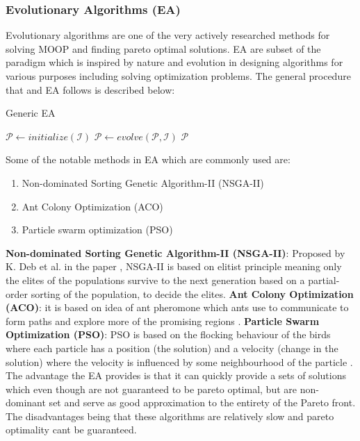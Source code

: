 \subsubsection{Evolutionary Algorithms (EA)}
Evolutionary algorithms are one of the very actively researched methods \cite{vikhar2016evolutionary} for solving MOOP and finding pareto optimal solutions. EA are subset of the paradigm which is inspired by nature and evolution in designing algorithms for various purposes including solving optimization problems. The general procedure that and EA follows is described below:
\begin{algorithm}
\caption{Generic EA}\label{algo_generic_ea}
\begin{algorithmic}
 
    \State $\mathcal{P} \gets initialize(\mathcal{I})$ 
     
        \State $\mathcal{P} \gets evolve(\mathcal{P},\mathcal{I})$ 
    \EndWhile
    \Return $\mathcal{P}$
\EndFunction
\end{algorithmic}
\end{algorithm}\newline Some of the notable methods in EA which are commonly used are:
\begin{enumerate}
    \item Non-dominated Sorting Genetic Algorithm-II (NSGA-II)
    \item Ant Colony Optimization (ACO)
    \item Particle swarm optimization (PSO)
\end{enumerate} 
\textbf{Non-dominated Sorting Genetic Algorithm-II (NSGA-II)}: \label{nsga_2} Proposed by K. Deb et al. in the paper \cite{deb2002fast}, NSGA-II is based on elitist principle meaning only the elites of the populations survive to the next generation based on a partial-order sorting of the population, to decide the elites.
\newline\newline \textbf{Ant Colony Optimization (ACO)}: \label{ant_colony_opt} it is based on idea of ant pheromone which ants use to communicate to form paths and explore more of the promising regions \cite{slowik2017nature}.
\newline\newline \textbf{Particle Swarm Optimization (PSO)}: \label{partical_swarm_opt} PSO is based on the flocking behaviour of the birds where each particle has a position (the solution) and a velocity (change in the solution) where the velocity is influenced by some neighbourhood of the particle \cite{poli2007particle}.
\newline\newline The advantage the EA provides is that it can quickly provide a sets of solutions which even though are not guaranteed to be pareto optimal, but are non-dominant set and serve as good approximation to the entirety of the Pareto front. The disadvantages being that these algorithms are relatively slow and pareto optimality cant be guaranteed.

